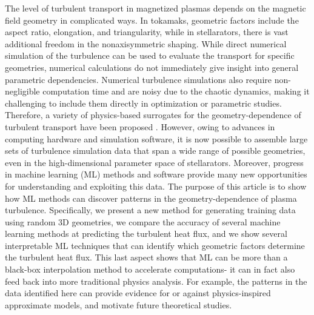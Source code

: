 \documentclass{jpp}
\newcommand{\changed}[1]{{#1}}
\begin{document}
The level of turbulent transport in magnetized plasmas depends on the magnetic field geometry in complicated ways.
In tokamaks,  geometric factors include the aspect ratio, elongation, and triangularity, while in stellarators, there is vast additional freedom in the nonaxisymmetric shaping.
While direct numerical simulation of the turbulence can be used to evaluate the transport for specific geometries, numerical calculations do not immediately give insight into general parametric dependencies. 
Numerical turbulence simulations also require non-negligible computation time and are noisy due to the chaotic dynamics, making it challenging to include them directly in optimization or parametric studies.
Therefore, a variety of physics-based surrogates for the geometry-dependence of turbulent transport have been proposed \changed{\citep{mynick2010optimizing, xanthopoulos2014controlling, mynick2014turbulent, proll2015tem, hegna2018theory, mackenbach2022available,NAKATA2022,nakayama2023simplified, roberg2023critical,goodman2024quasi}}.
However, owing to advances in computing hardware and simulation software, it is now possible to assemble large sets of turbulence simulation data that span a wide range of possible geometries, even in the high-dimensional parameter space of stellarators.
Moreover, progress in machine learning (ML) methods and software provide many new opportunities for understanding and exploiting this data.
The purpose of this article is to show how ML methods can discover patterns in the geometry-dependence of plasma turbulence.
Specifically, we present a new method for generating training data using random 3D geometries, we compare the accuracy of several machine learning methods at predicting the turbulent heat flux, and we show several interpretable ML techniques that can identify which geometric factors determine the turbulent heat flux.
This last aspect shows that ML can be more than a black-box interpolation method to accelerate computations- it can in fact also feed back into more traditional physics analysis.
For example, the patterns in the data identified here can provide evidence for or against physics-inspired approximate models, and motivate future theoretical studies.
\end{document}
